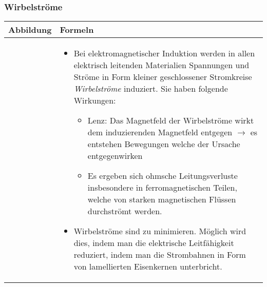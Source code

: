 \subsubsection{Wirbelströme}
\begin{tabular}{ | m{6cm} | m{12cm}  | }
	\hline
	Abbildung & Formeln \\ \hline
	\hline
	\begin{minipage}{.1\textwidth}
		\tabImg[width=6cm]{images/lamelliert.png}
	\end{minipage}
	&
	\begin{itemize}
		\item Bei elektromagnetischer Induktion werden in allen elektrisch leitenden Materialien Spannungen und Ströme in Form kleiner geschlossener Stromkreise \textit{Wirbelströme} induziert. Sie haben folgende Wirkungen:
		\begin{itemize}
			\item Lenz: Das Magnetfeld der Wirbelströme wirkt dem induzierenden Magnetfeld entgegen $\rightarrow$ es entstehen Bewegungen welche der Ursache entgegenwirken
			\item Es ergeben sich ohmsche Leitungsverluste insbesondere in ferromagnetischen Teilen, welche von starken magnetischen Flüssen durchströmt werden. 
		\end{itemize}
	\item Wirbelströme sind zu minimieren. Möglich wird dies, indem man die elektrische Leitfähigkeit reduziert, indem man die Strombahnen in Form von lamellierten Eisenkernen unterbricht. 
	\end{itemize}   	
	\\ \hline
\end{tabular}
























